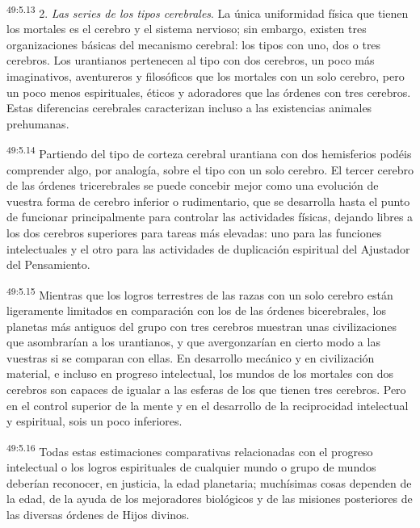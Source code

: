 \par
\textsuperscript{49:5.13} 2. \textit{Las series de los tipos cerebrales}. La única uniformidad física que tienen los mortales es el cerebro y el sistema nervioso; sin embargo, existen tres organizaciones básicas del mecanismo cerebral: los tipos con uno, dos o tres cerebros. Los urantianos pertenecen al tipo con dos cerebros, un poco más imaginativos, aventureros y filosóficos que los mortales con un solo cerebro, pero un poco menos espirituales, éticos y adoradores que las órdenes con tres cerebros. Estas diferencias cerebrales caracterizan incluso a las existencias animales prehumanas.

\par
\textsuperscript{49:5.14} Partiendo del tipo de corteza cerebral urantiana con dos hemisferios podéis comprender algo, por analogía, sobre el tipo con un solo cerebro. El tercer cerebro de las órdenes tricerebrales se puede concebir mejor como una evolución de vuestra forma de cerebro inferior o rudimentario, que se desarrolla hasta el punto de funcionar principalmente para controlar las actividades físicas, dejando libres a los dos cerebros superiores para tareas más elevadas: uno para las funciones intelectuales y el otro para las actividades de duplicación espiritual del Ajustador del Pensamiento.

\par
\textsuperscript{49:5.15} Mientras que los logros terrestres de las razas con un solo cerebro están ligeramente limitados en comparación con los de las órdenes bicerebrales, los planetas más antiguos del grupo con tres cerebros muestran unas civilizaciones que asombrarían a los urantianos, y que avergonzarían en cierto modo a las vuestras si se comparan con ellas. En desarrollo mecánico y en civilización material, e incluso en progreso intelectual, los mundos de los mortales con dos cerebros son capaces de igualar a las esferas de los que tienen tres cerebros. Pero en el control superior de la mente y en el desarrollo de la reciprocidad intelectual y espiritual, sois un poco inferiores.

\par
\textsuperscript{49:5.16} Todas estas estimaciones comparativas relacionadas con el progreso intelectual o los logros espirituales de cualquier mundo o grupo de mundos deberían reconocer, en justicia, la edad planetaria; muchísimas cosas dependen de la edad, de la ayuda de los mejoradores biológicos y de las misiones posteriores de las diversas órdenes de Hijos divinos.

